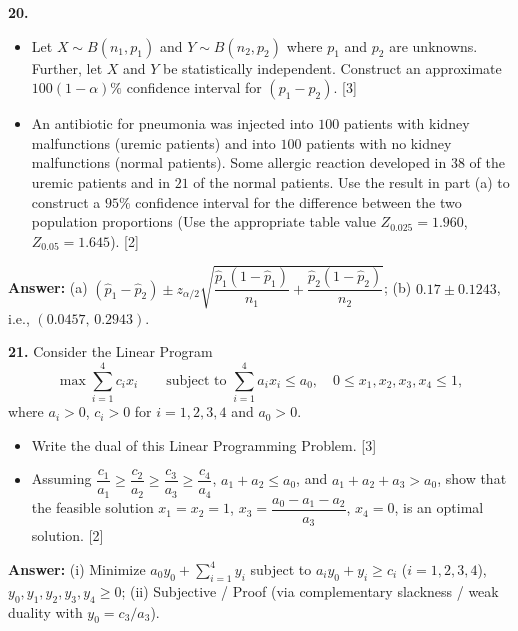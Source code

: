 \documentclass[11pt,a4paper]{article}
\newcommand{\ans}[1]{\textbf{Answer:} #1\par\medskip}
\begin{document}
\textbf{20.}
\begin{itemize}
  \setlength{\itemsep}{3pt}\setlength{\parskip}{0pt}
  \item[(a)] Let $X \sim B(n_1, p_1)$ and $Y \sim B(n_2, p_2)$ where $p_1$ and $p_2$ are unknowns. Further, let $X$ and $Y$ be statistically independent. Construct an approximate $100(1-\alpha)\%$ confidence interval for $(p_1 - p_2)$. \hfill [3]
  \item[(b)] An antibiotic for pneumonia was injected into $100$ patients with kidney malfunctions (uremic patients) and into $100$ patients with no kidney malfunctions (normal patients). Some allergic reaction developed in $38$ of the uremic patients and in $21$ of the normal patients. Use the result in part (a) to construct a $95\%$ confidence interval for the difference between the two population proportions (Use the appropriate table value $Z_{0.025} = 1.960$, $Z_{0.05} = 1.645$). \hfill [2]
\end{itemize}
\ans{(a) $(\hat{p}_1 - \hat{p}_2) \pm z_{\alpha/2}\sqrt{\dfrac{\hat{p}_1(1-\hat{p}_1)}{n_1} + \dfrac{\hat{p}_2(1-\hat{p}_2)}{n_2}}$; \quad (b) $0.17 \pm 0.1243$, i.e., $(0.0457,\, 0.2943)$.}

\textbf{21.} Consider the Linear Program
\[
  \max \sum_{i=1}^{4} c_i x_i \qquad \text{subject to } \sum_{i=1}^{4} a_i x_i \le a_0, \quad 0 \le x_1, x_2, x_3, x_4 \le 1,
\]
where $a_i > 0$, $c_i > 0$ for $i = 1, 2, 3, 4$ and $a_0 > 0$.
\begin{itemize}
  \setlength{\itemsep}{3pt}\setlength{\parskip}{0pt}
  \item[(i)] Write the dual of this Linear Programming Problem. \hfill [3]
  \item[(ii)] Assuming $\dfrac{c_1}{a_1} \ge \dfrac{c_2}{a_2} \ge \dfrac{c_3}{a_3} \ge \dfrac{c_4}{a_4}$, $a_1 + a_2 \le a_0$, and $a_1 + a_2 + a_3 > a_0$, show that the feasible solution $x_1 = x_2 = 1$, $x_3 = \dfrac{a_0 - a_1 - a_2}{a_3}$, $x_4 = 0$, is an optimal solution. \hfill [2]
\end{itemize}
\ans{(i) Minimize $a_0 y_0 + \displaystyle\sum_{i=1}^4 y_i$ subject to $a_i y_0 + y_i \ge c_i$ ($i=1,2,3,4$), $y_0, y_1, y_2, y_3, y_4 \ge 0$; \quad (ii) Subjective / Proof (via complementary slackness / weak duality with $y_0 = c_3/a_3$).}
\end{document}

